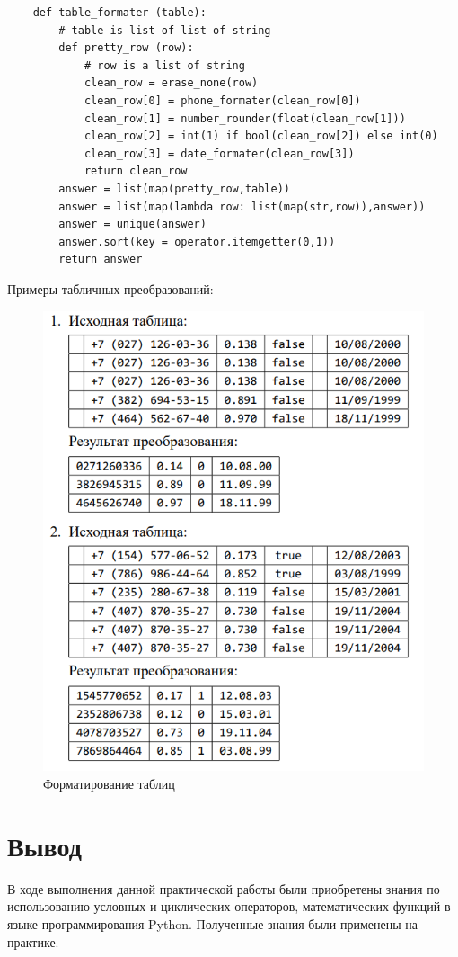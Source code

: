 \documentclass[a4paper,14pt]{extarticle}
\begin{document}
\begin{problem}
\begin{nonum}
\begin{lstlisting}
	def table_formater (table):
		# table is list of list of string
		def pretty_row (row):
			# row is a list of string
			clean_row = erase_none(row)
			clean_row[0] = phone_formater(clean_row[0])
			clean_row[1] = number_rounder(float(clean_row[1]))
			clean_row[2] = int(1) if bool(clean_row[2]) else int(0)
			clean_row[3] = date_formater(clean_row[3])
			return clean_row
		answer = list(map(pretty_row,table))
		answer = list(map(lambda row: list(map(str,row)),answer))
		answer = unique(answer)
		answer.sort(key = operator.itemgetter(0,1))
		return answer 
	\end{lstlisting}
	Примеры табличных преобразований:
	\begin{figure}[h!]
		\begin{center}
			\includegraphics[width=0.8\linewidth]{table-inp-outp}
			\caption{Форматирование таблиц}\label{pic:2.3}
		\end{center}	
	\end{figure}
\end{nonum}
\end{problem}
\section{Вывод}
В ходе выполнения данной практической работы были приобретены знания по использованию условных и циклических операторов, математических функций в языке программирования Python. Полученные знания были применены на практике.
\end{document}
